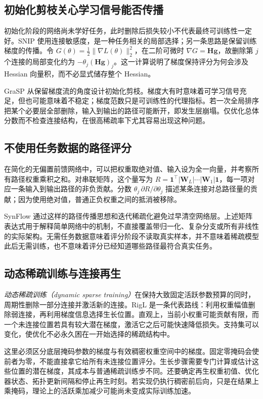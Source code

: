 \documentclass[UTF8,12pt,a4paper,fontset=fandol]{ctexart}
\begin{document}
\subsection{初始化剪枝关心学习信号能否传播}
初始化阶段的网络尚未学好任务，此时删除后损失较小不代表最终可训练性一定好。SNIP 使用连接敏感度，是一种任务相关的局部选择；另一条思路是保留训练梯度的传播。令 $G(\theta)=\tfrac12\|\nabla L(\theta)\|_2^2$，在二阶可微时 $\nabla G=\mathbf H\mathbf g$，故删除第 $j$ 个连接的局部变化约为 $-\theta_j(\mathbf H\mathbf g)_j$。这一计算说明了梯度保持评分为何会涉及 Hessian 向量积，而不必显式储存整个 Hessian。

GraSP 从保留梯度流的角度设计初始化剪枝\cite{wang2020}。梯度大有时意味着可学习信号充足，但也可能意味着不稳定；梯度范数只是可训练性的代理指标。若一次全局排序把某个必要层全部删除，输入到输出的路径可能断开，即发生层崩塌。仅优化总体分数而不检查连接结构，在很高稀疏率下尤其容易出现这种问题。

\subsection{不使用任务数据的路径评分}
在简化的无偏置前馈网络中，可以把权重取绝对值、输入设为全一向量，并考察所有路径权重乘积之和。对串联矩阵，这个量写为 $R=\mathbf 1^\top|\mathbf W_L|\cdots|\mathbf W_1|\mathbf 1$，每一项对应一条输入到输出路径的非负贡献。分数 $\theta_j\,\partial R/\partial\theta_j$ 描述某条连接对总路径量的贡献；因为使用绝对值，普通正负权重之间的抵消被移除。

SynFlow 通过这样的路径传播思想和迭代稀疏化避免过早清空网络层\cite{tanaka2020}。上述矩阵表达式用于解释简单网络中的机制，不直接覆盖带归一化、复杂分支或所有非线性的实际架构。无需任务数据意味着评分阶段不读取真实样本，并不意味着稀疏模型此后无需训练，也不意味着评分已经知道哪些路径最符合真实任务。

\subsection{动态稀疏训练与连接再生}
\emph{动态稀疏训练（dynamic sparse training）}在保持大致固定活跃参数预算的同时，周期性删除一部分连接并激活新的连接。RigL 是一条代表路线：利用权重幅值删除弱连接，再利用梯度信息选择生长位置\cite{evci2020}。直观上，当前小权重可能贡献有限，而一个未连接位置若具有较大潜在梯度，激活它之后可能快速降低损失。支持集可以变化，使优化不必永久困在一开始选择的稀疏结构中。

这里必须区分底层掩码参数的梯度与有效稠密权重空间中的梯度。固定零掩码会使前者为零，不能直接拿它给所有未连接位置评分。生长步骤需要专门计算或估计这些位置的潜在梯度，其成本与普通稀疏训练步不同。还要确定再生权重初值、优化器状态、拓扑更新间隔和停止再生时刻。若实现仍执行稠密前后向，只是在结果上乘掩码，理论上的活跃乘加减少可能尚未变成实际训练加速。
\end{document}

